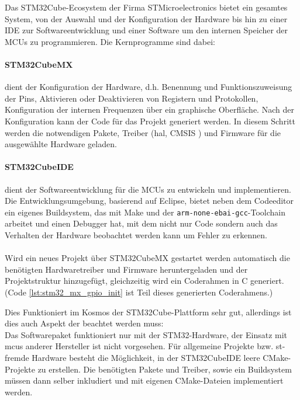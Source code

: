 Das STM32Cube-Ecosystem \cite{stm32cube_ecosystem} der Firma STMicroelectronics bietet ein gesamtes System, von der Auswahl und der Konfiguration der Hardware bis hin zu einer IDE zur Softwareentwicklung und einer Software um den internen Speicher der MCUs zu programmieren.
Die Kernprogramme sind dabei:

\paragraph{STM32CubeMX} 
	dient der Konfiguration der Hardware, d.h. Benennung und Funktionszuweisung der Pins, Aktivieren oder Deaktivieren von Registern und Protokollen, Konfiguration der internen Frequenzen über ein graphische Oberfläche.
	Nach der Konfiguration kann der Code für das Projekt generiert werden.
	In diesem Schritt werden die notwendigen Pakete, Treiber (\gls{hal}, CMSIS %
	) und Firmware für die ausgewählte Hardware geladen. \cite{stm32cubemx}

\paragraph{STM32CubeIDE}
	dient der Softwareentwicklung für die MCUs zu entwickeln und implementieren.
	Die Entwicklungsumgebung, basierend auf Eclipse, bietet neben dem Codeeditor ein eigenes Buildsystem, das mit Make und der \texttt{arm-none-ebai-gcc}-Toolchain arbeitet und einen Debugger hat, mit dem nicht nur Code sondern auch das Verhalten der Hardware beobachtet werden kann um Fehler zu erkennen. \cite{stm32cubeide}
\\
\\
Wird ein neues Projekt über STM32CubeMX gestartet werden automatisch die benötigten Hardwaretreiber und Firmware heruntergeladen und der Projektstruktur hinzugefügt, gleichzeitig wird ein Coderahmen in C generiert. (Code \ref{lst:stm32_mx_gpio_init} ist Teil dieses generierten Coderahmens.)

Dies Funktioniert im Kosmos der STM32Cube-Plattform sehr gut, allerdings ist dies auch Aspekt der beachtet werden muss:\\
Das Softwarepaket funktioniert nur mit der STM32-Hardware, der Einsatz mit \gls{mcu}s anderer Hersteller ist nicht vorgesehen.
Für allgemeine Projekte bzw. st-fremde Hardware besteht die Möglichkeit, in der STM32CubeIDE leere CMake-Projekte zu erstellen.
Die benötigten Pakete und Treiber, sowie ein Buildsystem müssen dann selber inkludiert und mit eigenen CMake-Dateien implementiert werden.


